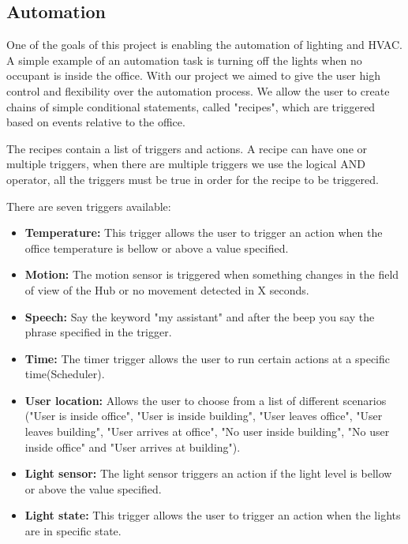 \subsection{Automation}

One of the goals of this project is enabling the automation of lighting and \ac{HVAC}. A simple example of an automation task is turning off the lights when no occupant is inside the office.
With our project we aimed to give the user high control and flexibility over the automation process. We allow the user to create chains of simple conditional statements, called "recipes", which are triggered based on events relative to the office.


The recipes contain a list of triggers and actions. A recipe can have one or multiple triggers, when there are multiple triggers we use the logical AND operator, all the triggers must be true in order for the recipe to be triggered.

There are seven triggers available:

\begin{itemize}
  \item \textbf{Temperature:} This trigger allows the user to trigger an action when the office temperature is bellow or above a value specified.
  \item \textbf{Motion:} The motion sensor is triggered when something changes in the field of view of the Hub or no movement detected in X seconds.
  \item \textbf{Speech:} Say the keyword "my assistant" and after the beep you say the phrase specified in the trigger.  
  \item \textbf{Time:} The timer trigger allows the user to run certain actions at a specific time(Scheduler).  
  \item \textbf{User location:} Allows the user to choose from a list of different scenarios ("User is inside office", "User is inside building", "User leaves office", "User leaves building", "User arrives at office", "No user inside building", "No user inside office" and "User arrives at building").
  \item \textbf{Light sensor:} The light sensor triggers an action if the light level is bellow or above the value specified.
  \item \textbf{Light state:} This trigger allows the user to trigger an action when the lights are in specific state.
  
\end{itemize}

